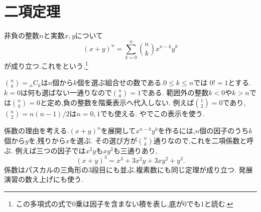 
\section{二項定理}\label{節：二項定理}
  非負の整数$n$と実数$x,y$について
    \[
      (x+y)^n=\sum_{k=0}^n\binom nk x^{n-k}y^k
    \]
  が成り立つ.これをという.\footnote{この多項式の式で0乗は因子を含まない積を表し,底が$0$でも$1$と読む.}

  $\binom nk={}_n\mathrm C_k$は$n$個から$k$個を選ぶ組合せの数である.$0\le k\le n$では
\BookMathLayout{\[
  \binom nk=\frac{n!}{k!(n-k)!}
    =\frac{n(n-1)\cdots(n-k+1)}{k!}
\]}{\[
\begin{aligned}
\binom nk&=\frac{n!}{k!(n-k)!}\\
&=\frac{n(n-1)\cdots(n-k+1)}{k!}.
\end{aligned}
\]}
  $0!=1$とする.$k=0$は何も選ばない一通りなので$\binom n0=1$である.
  範囲外の整数$k<0$や$k>n$では$\binom nk=0$と定め,負の整数を階乗表示へ代入しない.
  例えば$\binom12=0$であり,$\binom n2=n(n-1)/2$は$n=0,1$でも使える.
  やでこの表示を使う.

  係数の理由を考える.$(x+y)^n$を展開して$x^{n-k}y^k$を作るには,$n$個の因子のうち$k$個から$y$を,残りから$x$を選ぶ.
  その選び方が$\binom nk$通りなので,これを二項係数と呼ぶ.
  例えば三つの因子では$x^2y$も$xy^2$も三通りあり,
  \[
    (x+y)^3=x^3+3x^2y+3xy^2+y^3.
  \]
  係数はパスカルの三角形の3段目にも並ぶ.複素数にも同じ定理が成り立つ.
  発展演習の数え上げにも使う.
